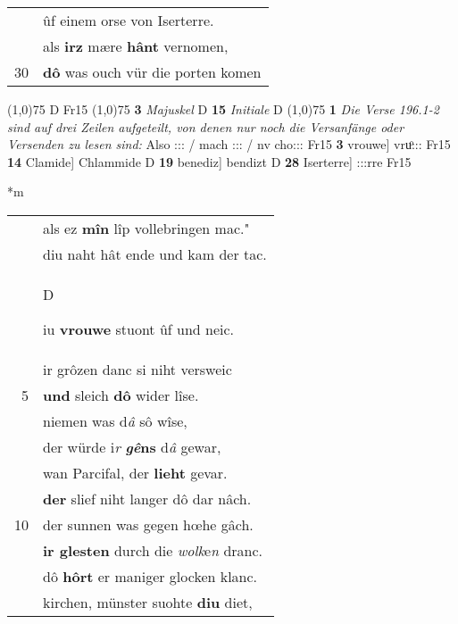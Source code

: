 \documentclass[8pt,a4paper,notitlepage]{article}
\begin{document}
\begin{table}[ht]
\begin{minipage}[t]{0.5\linewidth}
\begin{tabular}{rl}
 & ûf einem orse von Iserterre.\\ 
 & als \textbf{irz} mære \textbf{hânt} vernomen,\\ 
30 & \textbf{dô} was ouch vür die porten komen\\ 
\end{tabular}
\scriptsize
\line(1,0){75} \newline
D Fr15 \newline
\line(1,0){75} \newline
\textbf{3} \textit{Majuskel} D  \textbf{15} \textit{Initiale} D  \newline
\line(1,0){75} \newline
\textbf{1} \textit{Die Verse 196.1-2 sind auf drei Zeilen aufgeteilt, von denen nur noch die Versanfänge oder Versenden zu lesen sind:} Also ::: / mach ::: / nv cho::: Fr15  \textbf{3} vrouwe] vruͦ::: Fr15 \textbf{14} Clamide] Chlammide D \textbf{19} benediz] bendizt D \textbf{28} Iserterre] :::rre Fr15 \newline
\end{minipage}
\hspace{0.5cm}
\begin{minipage}[t]{0.5\linewidth}
\small
\begin{center}*m
\end{center}
\begin{tabular}{rl}
 & als ez \textbf{mîn} lîp vollebringen mac."\\ 
 & diu naht hât ende und kam der tac.\\ 
 & \begin{large}D\end{large}iu \textbf{vrouwe} stuont ûf und neic.\\ 
 & ir grôzen danc si niht versweic\\ 
5 & \textbf{und} sleich \textbf{dô} wider lîse.\\ 
 & niemen was d\textit{â} sô wîse,\\ 
 & der würde i\textit{r} \textbf{\textit{gê}ns} d\textit{â} gewar,\\ 
 & wan Parcifal, der \textbf{lieht} gevar.\\ 
 & \textbf{der} slief niht langer dô dar nâch.\\ 
10 & der sunnen was gegen hœhe gâch.\\ 
 & \textbf{ir glesten} durch die \textit{wolk}e\textit{n} dranc.\\ 
 & dô \textbf{hôrt} er maniger glocken klanc.\\ 
 & kirchen, münster suohte \textbf{diu} diet,\\ 

\end{tabular}
\end{minipage}
\end{table}
\end{document}
